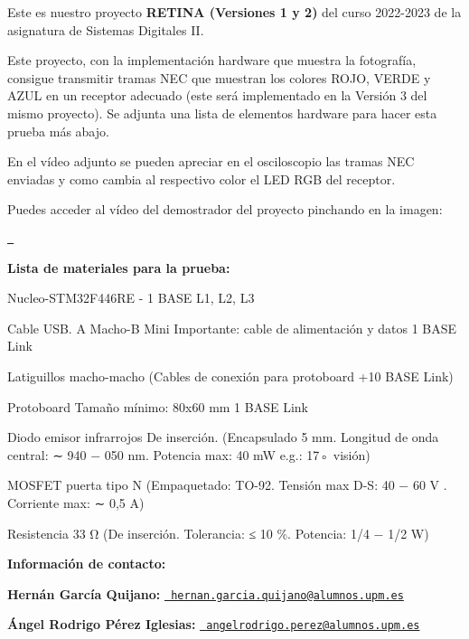 Este es nuestro proyecto {\bfseries{RETINA (Versiones 1 y 2)}} del curso 2022-\/2023 de la asignatura de Sistemas Digitales II.

Este proyecto, con la implementación hardware que muestra la fotografía, consigue transmitir tramas NEC que muestran los colores ROJO, VERDE y AZUL en un receptor adecuado (este será implementado en la Versión 3 del mismo proyecto). Se adjunta una lista de elementos hardware para hacer esta prueba más abajo.

En el vídeo adjunto se pueden apreciar en el osciloscopio las tramas NEC enviadas y como cambia al respectivo color el LED RGB del receptor.

Puedes acceder al vídeo del demostrador del proyecto pinchando en la imagen\+:

\href{https://youtube.com/shorts/jffZE0cjdjA?feature=share}{\texttt{ }}

{\bfseries{Lista de materiales para la prueba\+:}}
\begin{DoxyItemize}
\item Nucleo-\/\+STM32\+F446\+RE -\/ 1 BASE L1, L2, L3
\item Cable USB. A Macho-\/B Mini Importante\+: cable de alimentación y datos 1 BASE Link
\item Latiguillos macho-\/macho (Cables de conexión para protoboard +10 BASE Link)
\item Protoboard Tamaño mínimo\+: 80x60 mm 1 BASE Link
\item Diodo emisor infrarrojos De inserción. (Encapsulado 5 mm. Longitud de onda central\+: ∼ 940 − 050 nm. Potencia max\+: 40 mW e.\+g.\+: 17◦ visión)
\item MOSFET puerta tipo N (Empaquetado\+: TO-\/92. Tensión max D-\/S\+: 40 − 60 V . Corriente max\+: ∼ 0,5 A)
\item Resistencia 33 Ω (De inserción. Tolerancia\+: ≤ 10 \%. Potencia\+: 1/4 − 1/2 W)
\end{DoxyItemize}

{\bfseries{Información de contacto\+:}}

{\bfseries{Hernán García Quijano\+:}} \href{mailto:hernan.garcia.quijano@alumnos.upm.es}{\texttt{ hernan.\+garcia.\+quijano@alumnos.\+upm.\+es}}

{\bfseries{Ángel Rodrigo Pérez Iglesias\+:}} \href{mailto:angelrodrigo.perez@alumnos.upm.es}{\texttt{ angelrodrigo.\+perez@alumnos.\+upm.\+es}} 